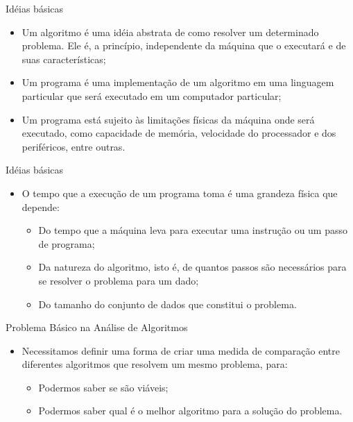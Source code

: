 \documentclass[12pt,table,xcolor={dvipsnames}]{beamer}
\begin{document}
\begin{frame}[fragile]{Idéias básicas}
\begin{itemize}
\item Um algoritmo é uma idéia abstrata de como resolver um determinado problema. Ele é, a princípio, independente da máquina que o executará e de suas características;
\item Um programa é uma implementação de um algoritmo em uma linguagem particular que será executado em um computador particular;
\item Um programa está sujeito às limitações físicas da máquina onde será executado, como capacidade de memória, velocidade do processador e dos periféricos, entre outras.
\end{itemize}
\end{frame}

\begin{frame}[fragile]{Idéias básicas}
\begin{itemize}
\item O tempo que a execução de um programa toma é uma grandeza física que depende:
\begin{itemize}
\item Do tempo que a máquina leva para executar uma instrução ou um passo de programa;
\item Da natureza do algoritmo, isto é, de quantos passos são necessários para se resolver o problema para um dado;
\item Do tamanho do conjunto de dados que constitui o problema.
\end{itemize}
\end{itemize}
\end{frame}

\begin{frame}[fragile]{Problema Básico na Análise de Algoritmos}
\begin{itemize}
\item Necessitamos definir uma forma de criar uma medida de comparação entre diferentes algoritmos que resolvem um mesmo problema, para:
\begin{itemize}
\item Podermos saber se são viáveis;
\item Podermos saber qual é o melhor algoritmo para a solução do problema.
\end{itemize}
\end{itemize}
\end{frame}
\end{document}
